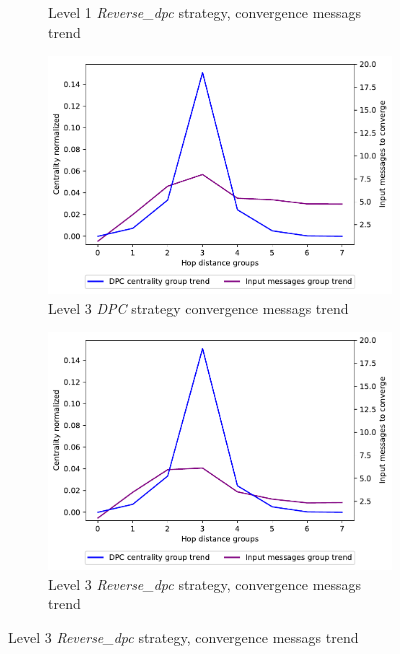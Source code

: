 \documentclass[10pt,conference,letterpaper]{IEEEtran}
\newcommand{\figwidth}{0.78}
\begin{document}
\begin{figure}[tb]
\begin{subfigure}{.49\columnwidth}
		\caption{Level 1 \textit{Reverse\_dpc} strategy, convergence messags trend}
		\label{fig:1000-reverse-dpc-msg-trend-level1}
	\end{subfigure}

	\begin{subfigure}{.49\columnwidth}
		\centering
		\includegraphics[width=\figwidth\columnwidth]{images/different_levels/1000-DPC-l7_node-conv_MRAI30_centVSmsg_trend.pdf}
		\caption{Level 3 \textit{DPC} strategy convergence messags trend}
		\label{fig:1000-dpc-msg-trend-level3}
	\end{subfigure}
	\hfill
	\begin{subfigure}{.49\columnwidth}
		\centering
		\includegraphics[width=\figwidth\columnwidth]{images/different_levels/1000-reverse_dpc-l7_node-conv_MRAI30_centVSmsg_trend.pdf}
		\caption{Level 3 \textit{Reverse\_dpc} strategy, convergence messags trend}
		\label{fig:1000-reverse-dpc-msg-trend-level3}
	\end{subfigure}


\end{figure}
\end{document}
